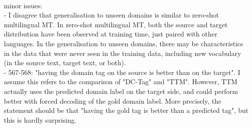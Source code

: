 \documentclass[12pt,times,a4paper,twoside]{article}
\theoremstyle{definition}
\begin{document}
\\
minor issues:
\\
- I disagree that generalisation to unseen domains is similar to zero-shot multilingual MT. In zero-shot multilingual MT, both the source and target distribution have been observed at training time, just paired with other languages. In the generalisation to unseen domains, there may be characteristics in the data that were never seen in the training data, including new vocabulary (in the source text, target text, or both).
\\
- 567-568: "having the domain tag on the source is better than on the
target". I assume this refers to the comparison of "DC-Tag" and "TTM". However, TTM actually uses the predicted domain label on the target side, and could perform better with forced decoding of the gold domain label. More precisely, the statement should be that "having the gold tag is better than a predicted tag", but this is hardly surprising.
\end{document}
